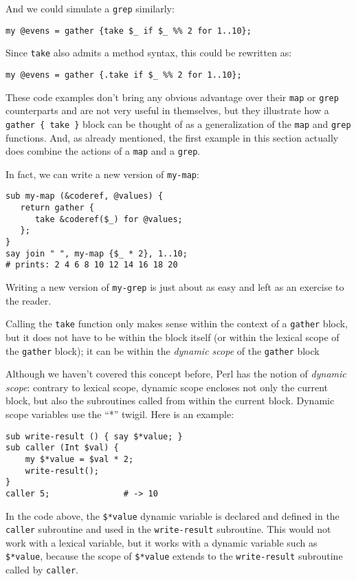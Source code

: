 And we could simulate a {\tt grep} similarly:

\begin{verbatim}
my @evens = gather {take $_ if $_ %% 2 for 1..10};
\end{verbatim}

Since {\tt take} also admits a method syntax, this could 
be rewritten as:

\begin{verbatim}
my @evens = gather {.take if $_ %% 2 for 1..10};
\end{verbatim}

These code examples don't bring any obvious advantage 
over their \verb'map' or {\tt grep} counterparts and 
are not very useful in themselves, but they illustrate 
how a \verb'gather { take }' block can be thought 
of as a generalization of the \verb'map' and 
{\tt grep} functions. And, as already mentioned, 
the first example in this section actually does combine 
the actions of a {\tt map} and a {\tt grep}.

In fact, we can write a new version of {\tt my-map}:

\begin{verbatim}
sub my-map (&coderef, @values) {
   return gather {
      take &coderef($_) for @values;
   };
}
say join " ", my-map {$_ * 2}, 1..10;
# prints: 2 4 6 8 10 12 14 16 18 20
\end{verbatim}

Writing a new version of {\tt my-grep} is just 
about as easy and left as an exercise to the reader.

Calling the {\tt take} function only makes sense 
within the context of a \verb'gather' block, but 
it does not have to be within the block itself 
(or within the lexical scope of the \verb'gather' 
block); it can be within the \emph{dynamic scope} of the 
\verb'gather' block

Although we haven't covered this concept before, 
Perl has the notion of \emph{dynamic scope}: contrary 
to lexical scope, dynamic scope encloses not only 
the current block, but also the subroutines called 
from within the current block. Dynamic scope variables 
use the ``*'' twigil. Here is an example:
%
\begin{verbatim}
sub write-result () { say $*value; }
sub caller (Int $val) { 
    my $*value = $val * 2; 
    write-result();
}
caller 5;               # -> 10
\end{verbatim}
%
In the code above, the \verb'$*value' dynamic variable 
is declared and defined in the \verb'caller' subroutine 
and used in the \verb'write-result' subroutine. This would not 
work with a lexical variable, but it works with a dynamic 
variable such as \verb'$*value', because the scope of 
\verb'$*value' extends to the \verb'write-result' subroutine 
called by \verb'caller'. 

